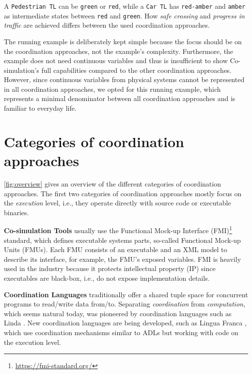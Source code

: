 \documentclass[runningheads]{llncs}
\begin{document}
A \texttt{Pedestrian TL} can be \texttt{green} or \texttt{red}, while a \texttt{Car TL} has \texttt{red-amber} and \texttt{amber} as intermediate states between \texttt{red} and \texttt{green}.
How \textit{safe crossing} and \textit{progress in traffic} are achieved differs between the used coordination approaches.

The running example is deliberately kept simple because the focus should be on the coordination approaches, not the example's complexity.
Furthermore, the example does not need continuous variables and thus is insufficient to show Co-simulation's full capabilities compared to the other coordination approaches.
However, since continuous variables from physical systems cannot be represented in all coordination approaches, we opted for this running example, which represents a minimal denominator between all coordination approaches and is familiar to everyday life.

\section{Categories of coordination approaches} \label{sec:approaches}

\autoref{fig:overview} gives an overview of the different categories of coordination approaches.
The first two categories of coordination approaches mostly focus on the \textit{execution} level, i.e., they operate directly with source code or executable binaries.

\textbf{Co-simulation Tools} usually use the Functional Mock-up Interface (FMI)\footnote{\url{https://fmi-standard.org/}} standard, which defines executable systems parts, so-called Functional Mock-up Units (FMUs).
Each FMU consists of an executable and an XML model to describe its interface, for example, the FMU's exposed variables.
FMI is heavily used in the industry because it protects intellectual property (IP) since executables are black-box, i.e., do not expose implementation details.

\textbf{Coordination Languages} traditionally offer a shared tuple space for concurrent programs to read/write data from/to.
Separating \textit{coordination} from \textit{computation}, which seems natural today, was pioneered by coordination languages such as Linda \cite{carrieroLindaContext1989}.
New coordination languages are being developed, such as Lingua Franca \cite{lohstrohReactorsDeterministicModel2020}, which use coordination mechanisms similar to ADLs but working with code on the execution level.
\end{document}
